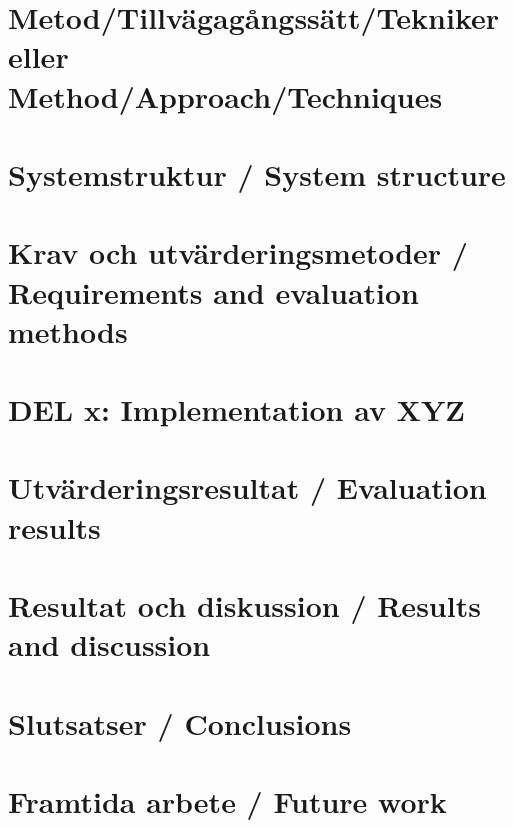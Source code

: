 \documentclass[a4paper,12pt]{article}
\begin{document}
\section{Metod/Tillvägagångssätt/Tekniker eller Method/Approach/Techniques}
\label{sec:metod}


\section{Systemstruktur / System structure}


\section{Krav och utvärderingsmetoder / Requirements and evaluation methods}\label{sec:krav}
\label{sec:krav}


\section{DEL x: Implementation av XYZ}


\section{Utvärderingsresultat / Evaluation results}


\section{Resultat och diskussion / Results and discussion}
\label{sec:resultat}


\section{Slutsatser / Conclusions}
\label{sec:slutsatser}


\section{Framtida arbete / Future work}



%



%

\newpage
\appendix %

\end{document}
